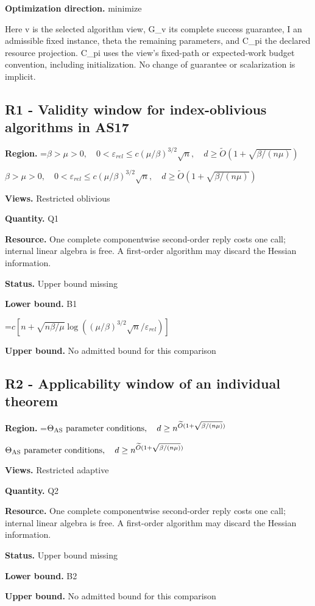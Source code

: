 \documentclass[10pt,a4paper]{article}
\newcommand{\AtlasMath}[1]{\par\begingroup\centering\setbox0=\hbox{$\displaystyle #1$}\ifdim\wd0>1.4\linewidth\typeout{ATLAS WIDE FORMULA: \the\wd0}\fi\ifdim\wd0>\linewidth\resizebox{\linewidth}{!}{\box0}\else\box0\fi\par\endgroup}
\newcommand{\AtlasInlineMath}[1]{\begingroup\setbox0=\hbox{$#1$}\ifdim\wd0>.4\linewidth\endgroup\AtlasMath{#1}\else\endgroup$#1$\fi}
\begin{document}
\textbf{Optimization direction.} minimize

Here v is the selected algorithm view, G\_v its complete success guarantee, I an admissible fixed instance, theta the remaining parameters, and C\_pi the declared resource projection. C\_pi uses the view's fixed-path or expected-work budget convention, including initialization. No change of guarantee or scalarization is implicit.

\subsection{R1 - Validity window for index-oblivious algorithms in AS17}
\textbf{Region.} \AtlasInlineMath{\beta>\mu>0,\quad0<\varepsilon_{rel}\le c(\mu/\beta)^{3/2}\sqrt n,\quad d\ge\widetilde{O}(1+\sqrt{\beta/(n\mu)})}

\textbf{Views.} Restricted oblivious

\textbf{Quantity.} Q1

\textbf{Resource.} One complete componentwise second-order reply costs one call; internal linear algebra is free. A first-order algorithm may discard the Hessian information.

\textbf{Status.} Upper bound missing

\textbf{Lower bound.} B1

\AtlasMath{c[n+\sqrt{n\beta/\mu}\log((\mu/\beta)^{3/2}\sqrt n/\varepsilon_{rel})]}
\textbf{Upper bound.} No admitted bound for this comparison

\subsection{R2 - Applicability window of an individual theorem}
\textbf{Region.} \AtlasInlineMath{\Theta_{\rm AS}\text{ parameter conditions},\quad d\ge n^{\widetilde{O}(1+\sqrt{\beta/(n\mu)})}}

\textbf{Views.} Restricted adaptive

\textbf{Quantity.} Q2

\textbf{Resource.} One complete componentwise second-order reply costs one call; internal linear algebra is free. A first-order algorithm may discard the Hessian information.

\textbf{Status.} Upper bound missing

\textbf{Lower bound.} B2

\textbf{Upper bound.} No admitted bound for this comparison
\end{document}
